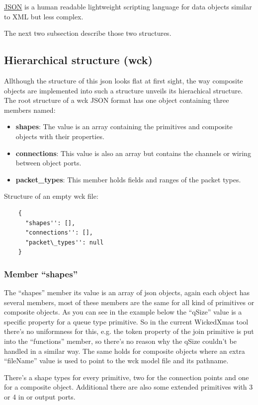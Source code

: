 \documentclass[a4paper,11pt,final]{article}
\begin{document}
\href{http://www.json.org/}{JSON} is a human readable lightweight scripting language for data objects similar
to XML but less complex.

The next two subsection describe those two structures.

\subsection{Hierarchical structure (wck)}
Allthough the structure of this json looks flat at first sight, the way composite objects are implemented into such
a structure unveils its hierachical structure.
The root structure of a wck JSON format has one object containing three members named:
\begin{itemize}
\item \textbf{shapes}: The value is an array containing the primitives and composite objects with their properties.
\item \textbf{connections}: This value is also an array but contains the channels or wiring between object ports.
\item \textbf{packet\_types}: This member holds fields and ranges of the packet types. 
\end{itemize}

Structure of an empty wck file:
\color{blue}
\begin{verbatim}
    {
      "shapes'': [],
      "connections'': [],
      "packet\_types'': null
    }
\end{verbatim}
\color{black}

\subsubsection{Member ``shapes''}
The ``shapes'' member its value is an array of json objects, again each object has several members,
most of these members are the same for all kind of primitives or composite objects. As you can see
in the example below the ``qSize'' value is a specific property for a queue type primitive.
So in the current WickedXmas tool there's no uniformness for this, e.g. the token property
of the join primitive is put into the ``functions'' member, so there's no reason why the qSize couldn't be
handled in a similar way. The same holds for composite objects where an extra ``fileName'' value is used to
point to the wck model file and its pathname.

There's a shape types for every primitive, two for the connection points and one for a composite object.
Additional there are also some extended primitives with 3 or 4 in or output ports.
\end{document}
